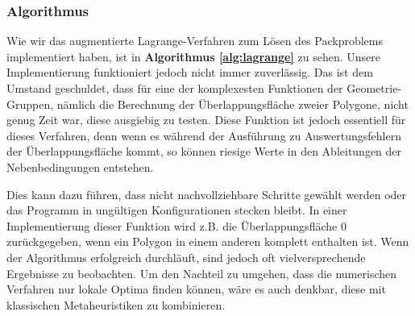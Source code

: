 \documentclass[runningheads,a4paper]{llncs}
\begin{document}
\subsubsection{Algorithmus}
Wie wir das augmentierte Lagrange-Verfahren zum Lösen des Packproblems implementiert haben, ist in \textbf{Algorithmus \ref{alg:lagrange}} zu sehen. Unsere Implementierung funktioniert jedoch nicht immer zuverlässig. Das ist dem Umstand geschuldet, dass für eine der komplexesten Funktionen der Geometrie-Gruppen, nämlich die Berechnung der Überlappungsfläche zweier Polygone, nicht genug Zeit war, diese ausgiebig zu testen. Diese Funktion ist jedoch essentiell für dieses Verfahren, denn wenn es während der Ausführung zu Auswertungsfehlern der Überlappungsfläche kommt, so können riesige Werte in den Ableitungen der Nebenbedingungen entstehen.

Dies kann dazu führen, dass nicht nachvollziehbare Schritte gewählt werden oder das Programm in ungültigen Konfigurationen stecken bleibt. In einer Implementierung dieser Funktion wird z.B. die Überlappungsfläche $0$ zurückgegeben, wenn ein Polygon in einem anderen komplett enthalten ist. Wenn der Algorithmus erfolgreich durchläuft, sind jedoch oft vielversprechende Ergebnisse zu beobachten. Um den Nachteil zu umgehen, dass die numerischen Verfahren nur lokale Optima finden können, wäre es auch denkbar, diese mit klassischen Metaheuristiken zu kombinieren.
\end{document}
